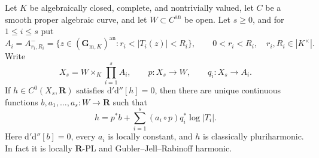 \begin{theorem}
\label{thm:p062-open-polyannulus-products-over-curves}
Let $K$ be algebraically closed, complete, and nontrivially valued, let
$C$ be a smooth proper algebraic curve, and let
$W\subset C^{\mathrm{an}}$ be open.  Let $s\geq0$, and for
$1\leq i\leq s$ put
\[
 A_i=A^-_{r_i,R_i}
 =\{z\in(\mathbf G_{\mathrm m,K})^{\mathrm{an}}:
                  r_i<|T_i(z)|<R_i\},
 \qquad 0<r_i<R_i,\quad r_i,R_i\in|K^\times|.
\]
Write
\[
 X_s=W\times_K\prod_{i=1}^sA_i,
 \qquad p:X_s\longrightarrow W,
 \qquad q_i:X_s\longrightarrow A_i.
\]
If $h\in C^0(X_s,\mathbf R)$ satisfies
$\mathrm d'\mathrm d''[h]=0$, then there are unique continuous functions
$b,a_1,\ldots,a_s:W\to\mathbf R$ such that
\[
 h=p^*b+\sum_{i=1}^s(a_i\circ p)q_i^*\log|T_i|.
\]
Here $\mathrm d'\mathrm d''[b]=0$, every $a_i$ is locally constant,
and $h$ is classically pluriharmonic.  In fact it is locally
$\mathbf R$-PL and Gubler--Jell--Rabinoff harmonic.
\end{theorem}

